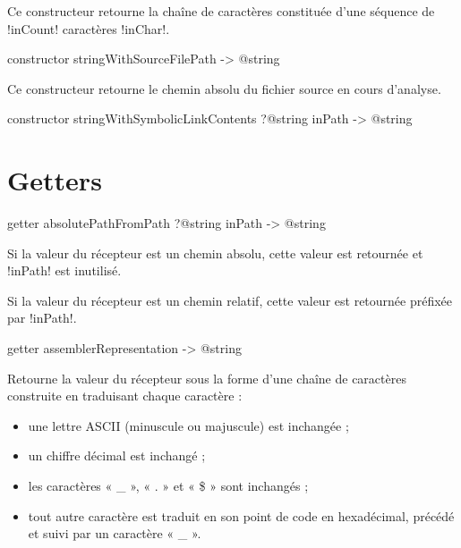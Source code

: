 Ce constructeur retourne la chaîne de caractères constituée d'une séquence de \ggs!inCount! caractères \ggs!inChar!.






\begin{galgasbox}
constructor stringWithSourceFilePath -> @string
\end{galgasbox}

Ce constructeur retourne le chemin absolu du fichier source en cours d'analyse.







\begin{galgasbox}
constructor stringWithSymbolicLinkContents ?@string inPath -> @string
\end{galgasbox}



















\section{Getters}


\begin{galgasbox}
getter absolutePathFromPath ?@string inPath -> @string
\end{galgasbox}

Si la valeur du récepteur est un chemin absolu, cette valeur est retournée et \ggs!inPath! est inutilisé.

Si la valeur du récepteur est un chemin relatif, cette valeur est retournée préfixée par \ggs!inPath!.





\begin{galgasbox}
getter assemblerRepresentation -> @string
\end{galgasbox}

Retourne la valeur du récepteur sous la forme d'une chaîne de caractères construite en traduisant chaque caractère :
\begin{itemize}
\item une lettre ASCII (minuscule ou majuscule) est inchangée ;
\item un chiffre décimal est inchangé ;
\item les caractères « \_ »,  « . » et  « \$ » sont inchangés ;
\item tout autre caractère est traduit en son point de code en hexadécimal, précédé et suivi par un caractère « \_ ».
\end{itemize}

